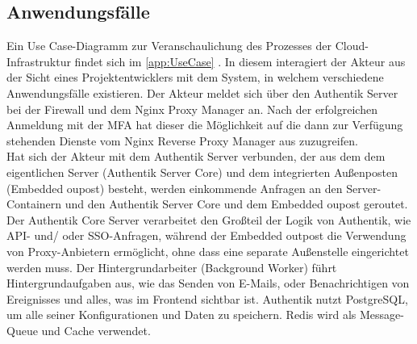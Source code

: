 \subsection{Anwendungsfälle}
\label{sec:Anwendungsfaelle}
Ein Use Case-Diagramm zur Veranschaulichung des Prozesses der Cloud-Infrastruktur findet sich im  \ref{app:UseCase} .
In diesem interagiert der Akteur aus der Sicht eines Projektentwicklers mit dem System, in welchem verschiedene 
Anwendungsfälle existieren. Der Akteur meldet sich über den Authentik Server bei der Firewall und dem Nginx Proxy Manager an. 
Nach der erfolgreichen Anmeldung mit der \acs{MFA} hat dieser die Möglichkeit auf die dann zur Verfügung stehenden Dienste vom 
Nginx Reverse Proxy Manager aus zuzugreifen.
\\Hat sich der Akteur mit dem Authentik Server verbunden, der aus dem dem eigentlichen Server (Authentik Server Core) und dem 
integrierten Außenposten (Embedded oupost) besteht, werden einkommende Anfragen an den Server-Containern und den Authentik Server Core 
und dem Embedded oupost geroutet. Der Authentik Core Server verarbeitet den Großteil der Logik von Authentik, wie \zB \acs{API}- und/ oder 
\acs{SSO}-Anfragen, während der Embedded outpost die Verwendung von Proxy-Anbietern ermöglicht, ohne dass eine separate Außenstelle 
eingerichtet werden muss. Der Hintergrundarbeiter (Background Worker) führt Hintergrundaufgaben aus, wie das Senden von E-Mails, 
oder Benachrichtigen von Ereignisses und alles, was im Frontend sichtbar ist. Authentik nutzt PostgreSQL, um alle seiner 
Konfigurationen und Daten zu speichern. Redis wird als Message-Queue und Cache verwendet.